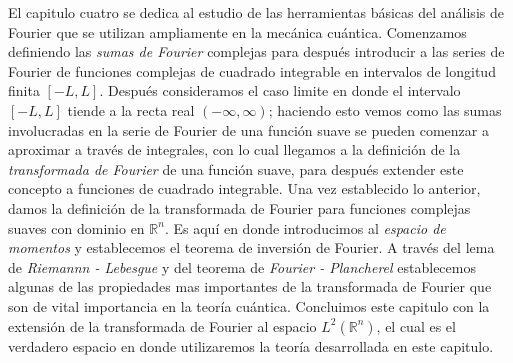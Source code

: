 \documentclass[12pt]{book}
\numberwithin{equation}{chapter}
\def\R{\mathbb{R}}
\begin{document}
El capitulo cuatro se dedica al estudio de las herramientas b\'asicas del an\'alisis de Fourier que se utilizan ampliamente en la mec\'anica cu\'antica. Comenzamos definiendo las \emph{sumas de Fourier} complejas para despu\'es introducir a las series de Fourier de funciones complejas de cuadrado integrable en intervalos de longitud finita $[-L,L]$. Despu\'es consideramos el caso limite en donde el intervalo $[-L,L]$ tiende a la recta real $( -\infty,\infty )$; haciendo esto vemos como las sumas involucradas en la serie de Fourier de una funci\'on suave se pueden comenzar a aproximar a trav\'es de integrales, con lo cual llegamos a la definici\'on de la \emph{transformada de Fourier} de una funci\'on suave, para despu\'es extender este concepto a funciones de cuadrado integrable. Una vez establecido lo anterior, damos la definici\'on de la transformada de Fourier para funciones complejas suaves con dominio en $\R^{n}$. Es aqu\'i en donde introducimos al \emph{espacio de momentos} y establecemos el teorema de inversi\'on de Fourier. A trav\'es del lema de \emph{Riemannn - Lebesgue} y del teorema de \emph{Fourier - Plancherel} establecemos algunas de las propiedades mas importantes de la transformada de Fourier que son de vital importancia en la teor\'ia cu\'antica. Concluimos este capitulo con la extensi\'on de la transformada de Fourier al espacio $L^{2}(\R^{n})$, el cual es el verdadero espacio en donde utilizaremos la teor\'ia desarrollada en este capitulo.\\
\end{document}
